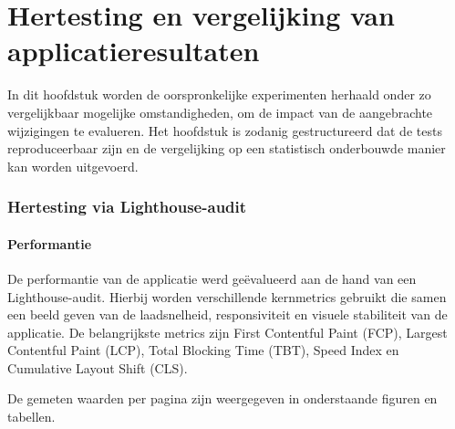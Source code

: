 \chapter{Hertesting en vergelijking van applicatieresultaten}
\label{ch:resultatenanalyse}

In dit hoofdstuk worden de oorspronkelijke experimenten herhaald onder zo vergelijkbaar mogelijke omstandigheden, om de impact van de aangebrachte wijzigingen te evalueren. Het hoofdstuk is zodanig gestructureerd dat de tests reproduceerbaar zijn en de vergelijking op een statistisch onderbouwde manier kan worden uitgevoerd.

\subsection{Hertesting via Lighthouse-audit}
\label{subsec:hertesting-lighthouse}

\subsubsection{Performantie}

De performantie van de applicatie werd geëvalueerd aan de hand van een Lighthouse-audit. Hierbij worden verschillende kernmetrics gebruikt die samen een beeld geven van de laadsnelheid, responsiviteit en visuele stabiliteit van de applicatie. De belangrijkste metrics zijn First Contentful Paint (FCP), Largest Contentful Paint (LCP), Total Blocking Time (TBT), Speed Index en Cumulative Layout Shift (CLS).

De gemeten waarden per pagina zijn weergegeven in onderstaande figuren en tabellen.

